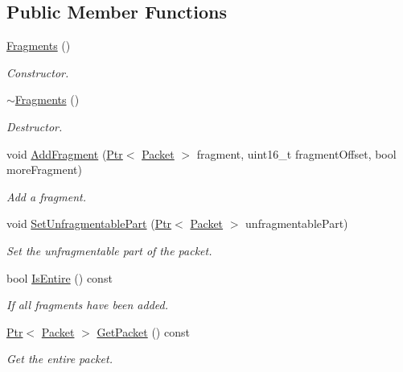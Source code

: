 \subsection*{Public Member Functions}
\begin{DoxyCompactItemize}
\item 
\hyperlink{classns3_1_1Ipv6ExtensionFragment_1_1Fragments_a1b0efd0dea57d3e1b028b8698e1e4dd9}{Fragments} ()
\begin{DoxyCompactList}\small\item\em Constructor. \end{DoxyCompactList}\item 
\hyperlink{classns3_1_1Ipv6ExtensionFragment_1_1Fragments_adac7e7c9e478c1f8b84883c3feadb82f}{$\sim$\+Fragments} ()
\begin{DoxyCompactList}\small\item\em Destructor. \end{DoxyCompactList}\item 
void \hyperlink{classns3_1_1Ipv6ExtensionFragment_1_1Fragments_a3d6e899ac3b7d4bdc2dacbeba2b5f56c}{Add\+Fragment} (\hyperlink{classns3_1_1Ptr}{Ptr}$<$ \hyperlink{classns3_1_1Packet}{Packet} $>$ fragment, uint16\+\_\+t fragment\+Offset, bool more\+Fragment)
\begin{DoxyCompactList}\small\item\em Add a fragment. \end{DoxyCompactList}\item 
void \hyperlink{classns3_1_1Ipv6ExtensionFragment_1_1Fragments_ad98a03686a09430f4f6cb7853de6da7e}{Set\+Unfragmentable\+Part} (\hyperlink{classns3_1_1Ptr}{Ptr}$<$ \hyperlink{classns3_1_1Packet}{Packet} $>$ unfragmentable\+Part)
\begin{DoxyCompactList}\small\item\em Set the unfragmentable part of the packet. \end{DoxyCompactList}\item 
bool \hyperlink{classns3_1_1Ipv6ExtensionFragment_1_1Fragments_aaeed7a11f774f53b0faf9d20a804efad}{Is\+Entire} () const 
\begin{DoxyCompactList}\small\item\em If all fragments have been added. \end{DoxyCompactList}\item 
\hyperlink{classns3_1_1Ptr}{Ptr}$<$ \hyperlink{classns3_1_1Packet}{Packet} $>$ \hyperlink{classns3_1_1Ipv6ExtensionFragment_1_1Fragments_a2c3a522898b3635c59ed50e91826ae91}{Get\+Packet} () const 
\begin{DoxyCompactList}\small\item\em Get the entire packet. \end{DoxyCompactList}\item 

\end{DoxyCompactItemize}
